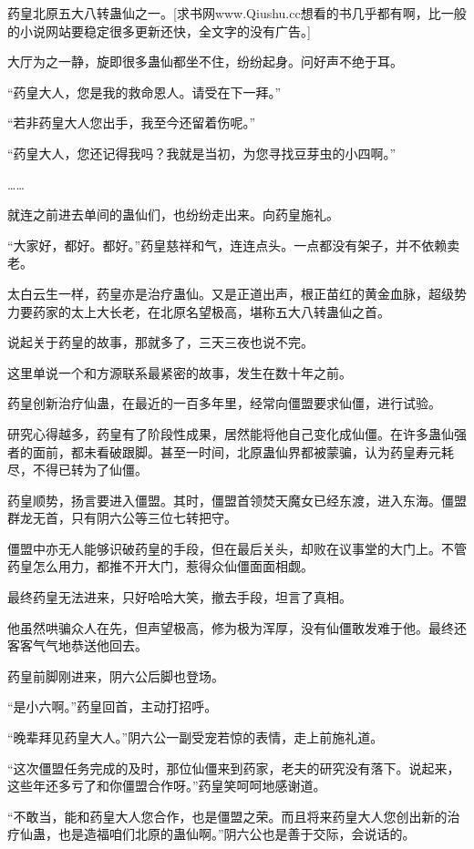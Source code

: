 \begin{this_body}
药皇北原五大八转蛊仙之一。[求书网www.Qiushu.cc想看的书几乎都有啊，比一般的小说网站要稳定很多更新还快，全文字的没有广告。]

大厅为之一静，旋即很多蛊仙都坐不住，纷纷起身。问好声不绝于耳。

“药皇大人，您是我的救命恩人。请受在下一拜。”

“若非药皇大人您出手，我至今还留着伤呢。”

“药皇大人，您还记得我吗？我就是当初，为您寻找豆芽虫的小四啊。”

……

就连之前进去单间的蛊仙们，也纷纷走出来。向药皇施礼。

“大家好，都好。都好。”药皇慈祥和气，连连点头。一点都没有架子，并不依赖卖老。

太白云生一样，药皇亦是治疗蛊仙。又是正道出声，根正苗红的黄金血脉，超级势力要药家的太上大长老，在北原名望极高，堪称五大八转蛊仙之首。

说起关于药皇的故事，那就多了，三天三夜也说不完。

这里单说一个和方源联系最紧密的故事，发生在数十年之前。

药皇创新治疗仙蛊，在最近的一百多年里，经常向僵盟要求仙僵，进行试验。

研究心得越多，药皇有了阶段性成果，居然能将他自己变化成仙僵。在许多蛊仙强者的面前，都未看破跟脚。甚至一时间，北原蛊仙界都被蒙骗，认为药皇寿元耗尽，不得已转为了仙僵。

药皇顺势，扬言要进入僵盟。其时，僵盟首领焚天魔女已经东渡，进入东海。僵盟群龙无首，只有阴六公等三位七转把守。

僵盟中亦无人能够识破药皇的手段，但在最后关头，却败在议事堂的大门上。不管药皇怎么用力，都推不开大门，惹得众仙僵面面相觑。

最终药皇无法进来，只好哈哈大笑，撤去手段，坦言了真相。

他虽然哄骗众人在先，但声望极高，修为极为浑厚，没有仙僵敢发难于他。最终还客客气气地恭送他回去。

药皇前脚刚进来，阴六公后脚也登场。

“是小六啊。”药皇回首，主动打招呼。

“晚辈拜见药皇大人。”阴六公一副受宠若惊的表情，走上前施礼道。

“这次僵盟任务完成的及时，那位仙僵来到药家，老夫的研究没有落下。说起来，这些年还多亏了和你僵盟合作呀。”药皇笑呵呵地感谢道。

“不敢当，能和药皇大人您合作，也是僵盟之荣。而且将来药皇大人您创出新的治疗仙蛊，也是造福咱们北原的蛊仙啊。”阴六公也是善于交际，会说话的。


\end{this_body}
